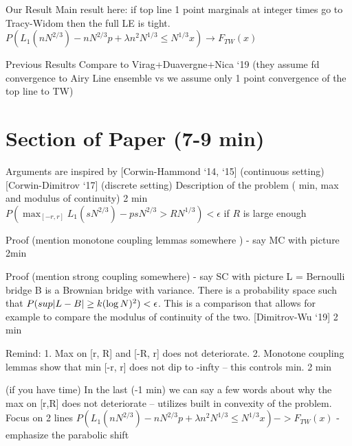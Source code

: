 \documentclass[9pt,t]{beamer}
\DeclarePairedDelimiter\abs{\lvert}{\rvert}
\begin{document}
\begin{frame}{Our Result}
Main result here: if top line 1 point marginals at integer times go to Tracy-Widom then the full LE is tight. 
$P(L_1(nN^{2/3}) - nN^{2/3} p + \lambda n^2 N^{1/3} \leq N^{1/3} x) \to F_{TW}(x)$
\end{frame}
\begin{frame}{Previous Results}
Compare to Virag+Duavergne+Nica ‘19 (they assume fd convergence to Airy Line ensemble vs we assume only 1 point convergence of the top line to TW)
\end{frame}
\section{Section of Paper (7-9 min)}
\begin{frame}
Arguments are inspired by [Corwin-Hammond ‘14, ‘15] (continuous setting) [Corwin-Dimitrov ‘17] (discrete setting) Description of the problem ( min, max and modulus of continuity)
2 min   $P( \max_{[-r, r]} L_1(sN^{2/3}) - psN^{2/3}  > RN^{1/3} ) < \epsilon$ if $R$ is large enough  
\end{frame}
\begin{frame}
Proof  (mention monotone coupling lemmas somewhere ) - say MC with picture
2min
\end{frame}
\begin{frame}
Proof  (mention strong coupling somewhere) - say SC with picture 
L = Bernoulli bridge B is a Brownian bridge with variance. There is a probability space such that $P( sup \abs*{L - B} \geq k (\log N)^2) < \epsilon$. This is a comparison that allows for example to compare the modulus of continuity of the two. [Dimitrov-Wu ‘19]
2 min
\end{frame}
\begin{frame}
Remind: 1. Max on [r, R] and [-R, r] does not deteriorate. 2. Monotone coupling lemmas show that min [-r, r] does not dip to -infty -- this controls min. 
2 min 
\end{frame}
\begin{frame}
(if you have time) In the last (-1 min) we can say a few words about why the max on [r,R] does not deteriorate -- utilizes built in convexity of the problem. Focus on 2 lines 
$P(L_1(nN^{2/3}) - nN^{2/3} p + \lambda n^2 N^{1/3} \leq N^{1/3} x) -> F_{TW}(x)$ - emphasize the parabolic shift
\end{frame}
\end{document}
